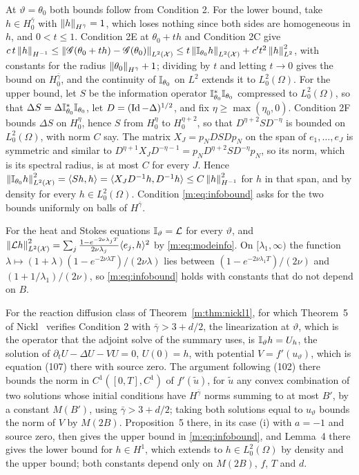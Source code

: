 \begin{remark}\label{m:rem:infobound}
At $\vartheta=\theta_0$ both bounds follow from Condition 2. For the lower bound, take $h\in H^{\bar\gamma}_0$ with $\left\|h\right\|_{H^{\bar\gamma}}=1$, which loses nothing since both sides are homogeneous in $h$, and $0<t\le1$. Condition 2E at $\theta_0+th$ and Condition 2C give $c\,t\left\|h\right\|_{H^{-1}}\le\left\|\mathscr{G}(\theta_0+th)-\mathscr{G}(\theta_0)\right\|_{L^2(\mathcal X)}\le t\left\|\mathbb{I}_{\theta_0}h\right\|_{L^2(\mathcal X)}+c't^2\left\|h\right\|^2_{L^2}$, with constants for the radius $\left\|\theta_0\right\|_{H^{\bar\gamma}}+1$; dividing by $t$ and letting $t\to0$ gives the bound on $H^{\bar\gamma}_0$, and the continuity of $\mathbb{I}_{\theta_0}$ on $L^2$ extends it to $L^2_0(\Omega)$. For the upper bound, let $S$ be the information operator $\mathbb{I}^*_{\theta_0}\mathbb{I}_{\theta_0}$ compressed to $L^2_0(\Omega)$, so that $\Delta S=\Delta\mathbb{I}^*_{\theta_0}\mathbb{I}_{\theta_0}$, let $D=(\operatorname{Id}-\Delta)^{1/2}$, and fix $\eta\ge\max(\eta_0,0)$. Condition 2F bounds $\Delta S$ on $H^\eta_0$, hence $S$ from $H^\eta_0$ to $H^{\eta+2}_0$, so that $D^{\eta+2}SD^{-\eta}$ is bounded on $L^2_0(\Omega)$, with norm $C$ say. The matrix $X_J=p_NDSDp_N$ on the span of $e_1,\dots,e_J$ is symmetric and similar to $D^{\eta+1}X_JD^{-\eta-1}=p_ND^{\eta+2}SD^{-\eta}p_N$, so its norm, which is its spectral radius, is at most $C$ for every $J$. Hence $\left\|\mathbb{I}_{\theta_0}h\right\|^2_{L^2(\mathcal X)}=\langle Sh,h\rangle=\langle X_JD^{-1}h,D^{-1}h\rangle\le C\left\|h\right\|^2_{H^{-1}}$ for $h$ in that span, and by density for every $h\in L^2_0(\Omega)$. Condition \eqref{m:eq:infobound} asks for the two bounds uniformly on balls of $H^{\bar\gamma}$.

For the heat and Stokes equations $\mathbb{I}_\vartheta=\mathcal{L}$ for every $\vartheta$, and $\left\|\mathcal{L} h\right\|^2_{L^2(\mathcal X)}=\sum_j\frac{1-e^{-2\nu\lambda_jT}}{2\nu\lambda_j}\langle e_j,h\rangle^2$ by \eqref{m:eq:modeinfo}. On $[\lambda_1,\infty)$ the function $\lambda\mapsto(1+\lambda)(1-e^{-2\nu\lambda T})/(2\nu\lambda)$ lies between $(1-e^{-2\nu\lambda_1T})/(2\nu)$ and $(1+1/\lambda_1)/(2\nu)$, so \eqref{m:eq:infobound} holds with constants that do not depend on $B$.

For the reaction diffusion class of Theorem~\ref{m:thm:nickl1}, for which Theorem~5 of Nickl~\cite{nicklbvm2024} verifies Condition 2 with $\bar\gamma>3+d/2$, the linearization at $\vartheta$, which is the operator that the adjoint solve of the summary uses, is $\mathbb{I}_\vartheta h=U_h$, the solution of $\partial_tU-\Delta U-VU=0$, $U(0)=h$, with potential $V=f'(u_\vartheta)$, which is equation (107) there with source zero. The argument following (102) there bounds the norm in $C^1([0,T],C^1)$ of $f'(\tilde u)$, for $\tilde u$ any convex combination of two solutions whose initial conditions have $H^{\bar\gamma}$ norms summing to at most $B'$, by a constant $M(B')$, using $\bar\gamma>3+d/2$; taking both solutions equal to $u_\vartheta$ bounds the norm of $V$ by $M(2B)$. Proposition~5 there, in its case (i) with $a=-1$ and source zero, then gives the upper bound in \eqref{m:eq:infobound}, and Lemma~4 there gives the lower bound for $h\in H^1$, which extends to $h\in L^2_0(\Omega)$ by density and the upper bound; both constants depend only on $M(2B)$, $f$, $T$ and $d$.


\end{remark}

